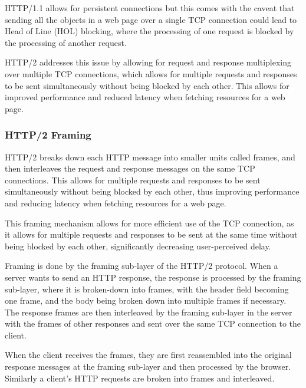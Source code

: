 \documentclass[12pt letter]{report}
\begin{document}

HTTP/1.1 allows for persistent connections but this comes with the
caveat that sending all the objects in a web page over a single TCP
connection could lead to Head of Line (HOL) blocking, where the
processing of one request is blocked by the processing of another request.

HTTP/2 addresses this issue by allowing for request and response
multiplexing over multiple TCP connections, which allows for multiple
requests and responses to be sent simultaneously without being
blocked by each other. This allows for improved performance and
reduced latency when fetching resources for a web page.

\subsubsection{HTTP/2 Framing}

HTTP/2 breaks down each HTTP message into smaller units called
frames, and then interleaves the request and response messages on the
same TCP connections. This allows for multiple requests and responses
to be sent simultaneously without being blocked by each other, thus
improving performance and reducing latency when fetching resources
for a web page.

This framing mechanism allows for more efficient use of the TCP
connection, as it allows for multiple requests and responses to be
sent at the same time without being blocked by each other,
significantly decreasing user-perceived delay.

Framing is done by the framing sub-layer of the HTTP/2 protocol. When
a server wants to send an HTTP response, the response is processed by
the framing sub-layer, where it is broken-down into frames, with the
header field becoming one frame, and the body being broken down into
multiple frames if necessary. The response frames are then
interleaved by the framing sub-layer in the server with the frames of
other responses and sent over the same TCP connection to the client.

When the client receives the frames, they are first reassembled into
the original response messages at the framing sub-layer and then
processed by the browser. Similarly a client's HTTP requests are
broken into frames and interleaved.
\end{document}
